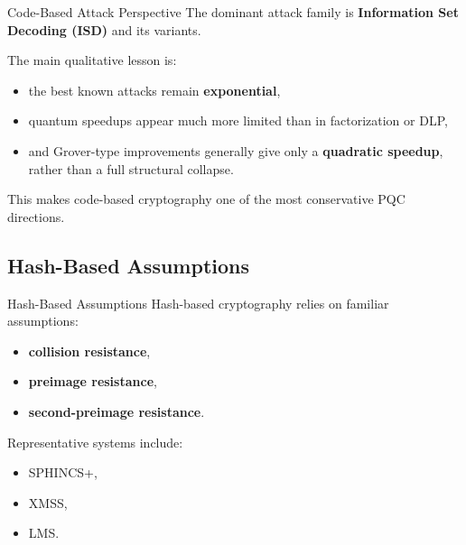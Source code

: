 \documentclass[aspectratio=169]{beamer}
\begin{document}
	\begin{frame}{Code-Based Attack Perspective}
		The dominant attack family is \textbf{Information Set Decoding (ISD)} and its variants.
		
		\vspace{0.5em}
		The main qualitative lesson is:
		\begin{itemize}
			\item the best known attacks remain \textbf{exponential},
			\item quantum speedups appear much more limited than in factorization or DLP,
			\item and Grover-type improvements generally give only a \textbf{quadratic speedup}, rather than a full structural collapse.
		\end{itemize}
		
		\vspace{0.5em}
		This makes code-based cryptography one of the most conservative PQC directions.
	\end{frame}
	
	\subsection{Hash-Based Assumptions}
	
	\begin{frame}{Hash-Based Assumptions}
		Hash-based cryptography relies on familiar assumptions:
		\begin{itemize}
			\item \textbf{collision resistance},
			\item \textbf{preimage resistance},
			\item \textbf{second-preimage resistance}.
		\end{itemize}
		
		\vspace{0.5em}
		Representative systems include:
		\begin{itemize}
			\item SPHINCS+,
			\item XMSS,
			\item LMS.
		\end{itemize}
	\end{frame}
	
\end{document}
